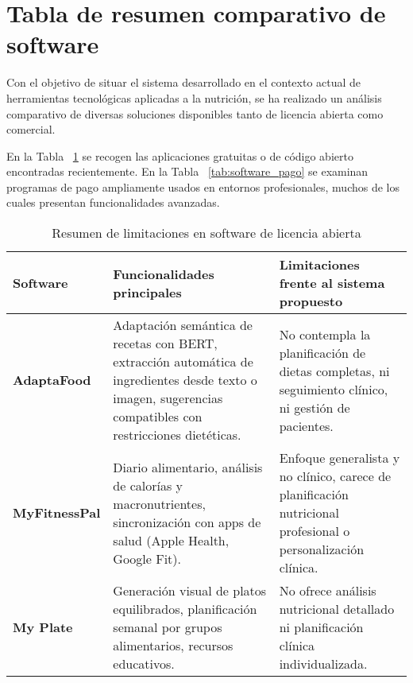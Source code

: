 \section{Tabla de resumen comparativo de software}
Con el objetivo de situar el sistema desarrollado en el contexto actual de herramientas tecnológicas aplicadas a la nutrición, se ha realizado un análisis comparativo de diversas soluciones disponibles tanto de licencia abierta como comercial. 

En la Tabla ~\ref{tab:software_licencia_abierta} se recogen las aplicaciones gratuitas o de código abierto encontradas recientemente. En la Tabla ~\ref{tab:software_pago} se examinan programas de pago ampliamente usados en entornos profesionales, muchos de los cuales presentan funcionalidades avanzadas.

\begin{table}[t]
\begin{longtable}{|p{2.6cm}|p{4.4cm}|p{4.4cm}|}
\hline
\textbf{Software} & \textbf{Funcionalidades principales} & \textbf{Limitaciones frente al sistema propuesto} \\
\hline
\textbf{AdaptaFood} & Adaptación semántica de recetas con BERT, extracción automática de ingredientes desde texto o imagen, sugerencias compatibles con restricciones dietéticas. & No contempla la planificación de dietas completas, ni seguimiento clínico, ni gestión de pacientes. \\
\hline
\textbf{MyFitnessPal} & Diario alimentario, análisis de calorías y macronutrientes, sincronización con apps de salud (Apple Health, Google Fit). & Enfoque generalista y no clínico, carece de planificación nutricional profesional o personalización clínica. \\
\hline
\textbf{My Plate} & Generación visual de platos equilibrados, planificación semanal por grupos alimentarios, recursos educativos. & No ofrece análisis nutricional detallado ni planificación clínica individualizada. \\
\hline
\end{longtable}
\caption{Resumen de limitaciones en software de licencia abierta}
\label{tab:software_licencia_abierta}
\end{table}

